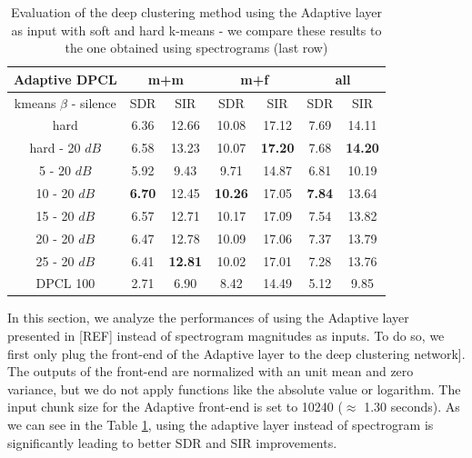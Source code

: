 \documentclass[master, tikz, final,11pt, dvipdfmx]{iscs-thesis}
\begin{document}
\begin{table}[h]
\centering
\begin{tabular}{c|c|c|c|c|c|c}
Adaptive DPCL & \multicolumn{2}{c|}{m+m} & \multicolumn{2}{c|}{m+f} & \multicolumn{2}{c}{all} \\ 
\hline 
kmeans $\beta$ - silence & SDR & SIR & SDR & SIR & SDR & SIR \\ 
\hline 
hard & 6.36 & 12.66 & 10.08 & 17.12 & 7.69 & 14.11 \\ 
hard - 20 $dB$ & 6.58 & 13.23 & 10.07 & \textbf{17.20} & 7.68 & \textbf{14.20} \\ 
\hline 
\hline 
5 - 20 $dB$ & 5.92 & 9.43 & 9.71 & 14.87 & 6.81 & 10.19 \\ 
10 - 20 $dB$ & \textbf{6.70} & 12.45 & \textbf{10.26} & 17.05 & \textbf{7.84} & 13.64 \\ 
15 - 20 $dB$ & 6.57 & 12.71 & 10.17 & 17.09 & 7.54 & 13.82 \\ 
20 - 20 $dB$ & 6.47 & 12.78 & 10.09 & 17.06 & 7.37 & 13.79 \\ 
25 - 20 $dB$ & 6.41 & \textbf{12.81} & 10.02 & 17.01 & 7.28 & 13.76 \\ 
\hline 
\hline 
DPCL 100 & 2.71 & 6.90 & 8.42 & 14.49 & 5.12 & 9.85 \\ 
\end{tabular}
\captionsetup{justification=centering}
\caption{Evaluation of the deep clustering method using the Adaptive layer as input with soft and hard k-means - we compare these results to the one obtained using spectrograms  (last row)}
\label{table:AdaptDPCL100}
\end{table}


In this section, we analyze the performances of using the Adaptive layer presented in [REF] instead of spectrogram magnitudes as inputs.
To do so, we first only plug the front-end of the Adaptive layer to the deep clustering network]. The outputs of the front-end are normalized with an unit mean and zero variance, 
but we do not apply functions like the absolute value or logarithm.
The input chunk size for the Adaptive front-end is set to 10240 ($\approx$ 1.30 seconds). 
As we can see in the Table \ref{table:AdaptDPCL100}, using the adaptive layer instead of spectrogram is significantly leading to better SDR and SIR improvements.
\end{document}
